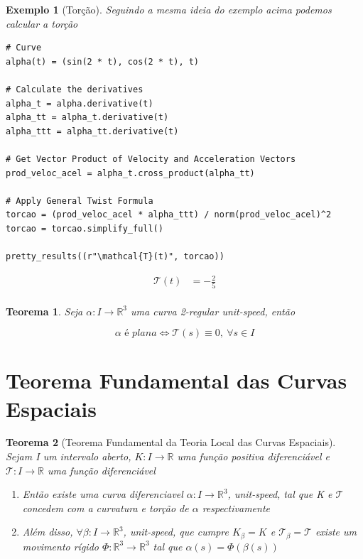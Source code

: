 \documentclass[12pt]{article}
\newtheorem{ex}{Exemplo}[section]
\newtheorem{theorem}{Teorema}
\begin{document}
\begin{ex}[Torção]
Seguindo a mesma ideia do exemplo acima podemos calcular a torção

\begin{lstlisting}
# Curve
alpha(t) = (sin(2 * t), cos(2 * t), t)

# Calculate the derivatives
alpha_t = alpha.derivative(t)
alpha_tt = alpha_t.derivative(t)
alpha_ttt = alpha_tt.derivative(t)
    
# Get Vector Product of Velocity and Acceleration Vectors
prod_veloc_acel = alpha_t.cross_product(alpha_tt)
    
# Apply General Twist Formula
torcao = (prod_veloc_acel * alpha_ttt) / norm(prod_veloc_acel)^2
torcao = torcao.simplify_full()

pretty_results((r"\mathcal{T}(t)", torcao))
\end{lstlisting}

\newcommand{\Bold}[1]{\mathbf{#1}}\begin{align*} \mathcal{T}(t) &= -\frac{2}{5} \\ \end{align*}
\end{ex}

\begin{theorem}
Seja $\alpha: I \rightarrow \mathbb{R}^3$ uma curva 2-regular \textit{unit-speed}, então

$$\alpha \textit{ é plana} \Longleftrightarrow \mathcal{T}(s) \equiv 0,\ \forall s \in I$$
\end{theorem}

\section*{Teorema Fundamental das Curvas Espaciais}
\label{s6}

\begin{theorem}[Teorema Fundamental da Teoria Local das Curvas Espaciais]
Sejam I um intervalo aberto, $K: I \rightarrow \mathbb{R}$ uma função positiva diferenciável e $\mathcal{T}: I \rightarrow \mathbb{R}$ uma função diferenciável

\begin{enumerate}
    \item Então existe uma curva diferenciavel $\alpha: I \rightarrow \mathbb{R}^3$, unit-speed, tal que K e $\mathcal{T}$ concedem com a curvatura e torção de $\alpha$ respectivamente
    
    \item Além disso, $\forall \beta: I \rightarrow \mathbb{R}^3$, unit-speed, que cumpre $K_\beta = K$ e $\mathcal{T}_\beta = \mathcal{T}$ existe um movimento rígido $\Phi: \mathbb{R}^3 \rightarrow \mathbb{R}^3$ tal que $\alpha(s) = \Phi(\beta(s))$ 
\end{enumerate}
\end{theorem}




\end{document}
